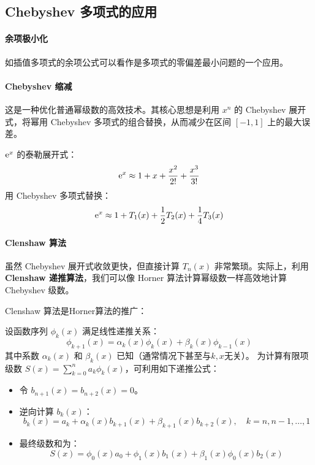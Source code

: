 \subsection{Chebyshev 多项式的应用}
\paragraph{余项极小化} 如插值多项式的余项公式可以看作是多项式的零偏差最小问题的一个应用。

\paragraph{Chebyshev 缩减}
这是一种优化普通幂级数的高效技术。其核心思想是利用 \(x^n\) 的 Chebyshev 展开式，将幂用 Chebyshev
多项式的组合替换，从而减少在区间 \([-1, 1]\) 上的最大误差。

\begin{example}[\(\e^x\) 的切比雪夫缩减]
    \(\mathrm{e}^{x} \) 的泰勒展开式：
    \[
        \mathrm{e}^{x} \approx 1 + x + \frac{x^2}{2!} + \frac{x^3}{3!}
    \]
    用 Chebyshev 多项式替换：
    \[
        \mathrm{e}^{x} \approx 1 + T_1(x) + \frac{1}{2} T_2(x) + \frac{1}{4} T_3(x)
    \]
\end{example}

\paragraph{Clenshaw 算法}
虽然 Chebyshev 展开式收敛更快，但直接计算 \(T_n(x)\) 非常繁琐。实际上，利用
\textbf{Clenshaw 递推算法}，我们可以像 Horner 算法计算幂级数一样高效地计算 Chebyshev 级数。

Clenshaw 算法是Horner算法的推广：
\begin{theorem}[Clenshaw 算法]
    设函数序列 \(\phi_k(x)\) 满足线性递推关系：
    \[ \phi_{k+1}(x) = \alpha_k(x) \phi_k(x) + \beta_k(x) \phi_{k-1}(x) \]
    其中系数 \(\alpha_k(x)\) 和 \(\beta_k(x)\) 已知（通常情况下甚至与\(k, x\)无关）。
    为计算有限项级数 \(S(x) =
    \sum_{k=0}^n a_k \phi_k(x)\)，可利用如下递推公式：
    \begin{itemize}
        \item 令 \(b_{n+1}(x) = b_{n+2}(x) = 0\)。
        \item 逆向计算 \(b_k(x)\)：
            \[ b_k(x) = a_k + \alpha_k(x) b_{k+1}(x) + \beta_{k+1}(x)
            b_{k+2}(x), \quad k = n, n-1, \dots, 1 \]
        \item 最终级数和为：
            \[ S(x) = \phi_0(x) a_0 + \phi_1(x) b_1(x) + \beta_1(x)
            \phi_0(x) b_2(x) \]
    \end{itemize}
\end{theorem}

